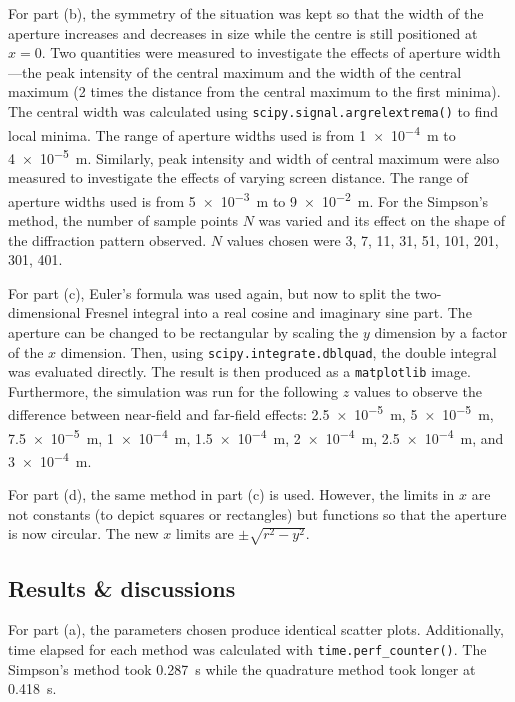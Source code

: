 \documentclass[hyphens,twocolumn,nobalancelastpage,aps,10pt,citeautoscript,longbibliography]{revtex4-2}
\begin{document}
For part (b), the symmetry of the situation was kept so that the width of the
aperture increases and decreases in size while the centre is still positioned
at $x = 0$. Two quantities were measured to investigate the effects of aperture
width---the peak intensity of the central maximum and the width of the central
maximum (2 times the distance from the central maximum to the first minima).
The central width was calculated using \lstinline{scipy.signal.argrelextrema()}
to find local minima. The range of aperture widths used is from
\qty{1e-4}{\metre} to \qty{4e-5}{\metre}. Similarly, peak intensity and width
of central maximum were also measured to investigate the effects of varying
screen distance. The range of aperture widths used is from \qty{5e-3}{\metre}
to \qty{9e-2}{\metre}. For the Simpson's method, the number of sample points
$N$ was varied and its effect on the shape of the diffraction pattern observed.
$N$ values chosen were 3, 7, 11, 31, 51, 101, 201, 301, 401.

For part (c), Euler's formula was used again, but now to split the
two-dimensional Fresnel integral into a real cosine and imaginary sine part.
The aperture can be changed to be rectangular by scaling the $y$ dimension by a
factor of the $x$ dimension. Then, using \lstinline{scipy.integrate.dblquad},
the double integral was evaluated directly. The result is then produced as a
\lstinline{matplotlib} image. Furthermore, the simulation was run for the
following $z$ values to observe the difference between near-field and far-field
effects: \qty{2.5e-5}{\metre}, \qty{5e-5}{\metre}, \qty{7.5e-5}{\metre},
\qty{1e-4}{\metre}, \qty{1.5e-4}{\metre}, \qty{2e-4}{\metre},
\qty{2.5e-4}{\metre}, and \qty{3e-4}{\metre}.

For part (d), the same method in part (c) is used. However, the limits in $x$
are not constants (to depict squares or rectangles) but functions so that the
aperture is now circular. The new $x$ limits are $\pm\sqrt{r^2 - y^2}$.


\subsection{Results \& discussions}%
\label{sub:results_and_discussions_1}

\noindent For part (a), the parameters chosen produce identical scatter plots.
Additionally, time elapsed for each method was calculated with
\lstinline{time.perf_counter()}. The Simpson's method took \qty{0.287}{\second}
while the quadrature method took longer at \qty{0.418}{\second}.
\end{document}
